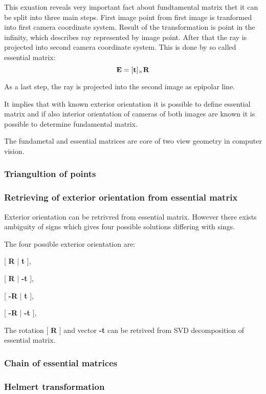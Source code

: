 \documentclass[a4paper,12pt]{report}
\newcommand{\ematr}[1]{
{\bf #1}
}
\newcommand{\evect}[1]{
{\bf #1}
}
\begin{document}
This exuation reveals very important fact about fundtamental matrix thet it can be split into three  main steps.
First image point from first image is tranformed into first camera coordinate system. Result of the transformation is 
point in the infinity, which describes ray represented by image point. 
After that the ray is projected into second camera coordinate system. This is done by so called essential matrix:
\begin{equation}
	 \ematr{E}  = [\evect{t}]_{\times} \ematr{R}
\end{equation}


As a last step, the ray is projected into the second image as epipolar line.


It implies that with known exterior orientation it is possible to define essential matrix and if also interior orientation of 
cameras of both images are known it is possible to determine fundamental matrix. 


The fundametal and essential matrices are core of two view geometry in computer vision.

\subsubsection{Triangultion of points}
\label{sec:triang}

\subsubsection{Retrieving of exterior orientation from essential matrix}
\label{sec:ess_eo}
Exterior orientation can be retrivred from essential matrix. However there exists ambiguity of signs which gives 
four possible solutions differing with sings.

The four possible exterior orientation are:

[\ematr{R}|\evect{t}],

[\ematr{R}|\evect{-t}],

[\ematr{-R}|\evect{t}],

[\ematr{-R}|\evect{-t}],

The rotation [\ematr{R}] and vector \evect{-t} can be retrived from SVD decomposition of essential matrix.

\subsubsection{Chain of essential matrices}
\label{sec:ess_chain}


\subsubsection{Helmert transformation}
\label{sec:helmert}
\end{document}

